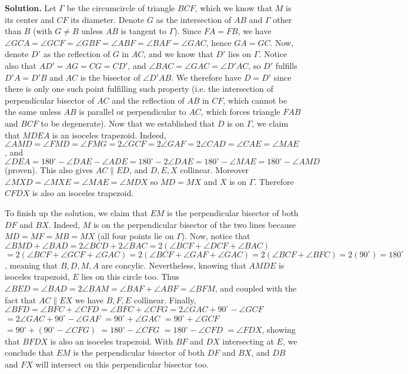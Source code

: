 \documentclass[11pt,a4paper]{article}
\begin{document}
\begin{itemize}
\textbf{Solution.} 
Let $\Gamma$ be the circumcircle of triangle $BCF$, which we know that $M$ is its center and $CF$ its diameter. 
Denote $G$ as the intersection of $AB$ and $\Gamma$ other than $B$ (with $G\neq B$ unless $AB$ is tangent to $\Gamma$). 
Since $FA=FB$, we have 
$\angle GCA=\angle GCF=\angle GBF=\angle ABF=\angle BAF=\angle GAC$, hence $GA=GC$. 
Now, denote $D'$ as the reflection of $G$ in $AC$, and we know that $D'$ lies on $\Gamma$. 
Notice also that $AD'=AG=CG=CD'$, and $\angle BAC=\angle GAC=\angle D'AC$, so $D'$ fulfills $D'A=D'B$ and $AC$ is the bisector of $\angle D'AB$. 
We therefore have $D=D'$ since there is only one such point fulfilling such property (i.e. the intersection of perpendicular bisector of $AC$ and the reflection of $AB$ in $CF$, which cannot be the same unless $AB$ is parallel or perpendicular to $AC$, which forces triangle $FAB$ and $BCF$ to be degenerate). 
Now that we established that $D$ is on $\Gamma$, we claim that $MDEA$ is an isoceles trapezoid. 
Indeed, $\angle AMD=\angle FMD=\angle FMG=2\angle GCF=2\angle GAF=2\angle CAD=\angle CAE=\angle MAE$, 
and $\angle DEA=180^{\circ}-\angle DAE-\angle ADE=180^{\circ}-2\angle DAE=180^{\circ}-\angle MAE=180^{\circ}-\angle AMD$ 
(proven). This also gives $AC\parallel ED$, and $D, E, X$ collinear. Moreover $\angle MXD=\angle MXE=\angle MAE=\angle MDX$ so $MD=MX$ and $X$ is on $\Gamma$. Therefore $CFDX$ is also an isoceles trapezoid. 

To finish up the solution, we claim that $EM$ is the perpendicular bisector of both $DF$ and $BX$. 
Indeed, $M$ is on the perpendicular bisector of the two lines because $MD=MF=MB=MX$ (all four points lie on $\Gamma$). 
Now, notice that $\angle BMD+\angle BAD=2\angle BCD+2\angle BAC=2(\angle BCF+\angle DCF+\angle BAC)$
$=2(\angle BCF+\angle GCF+\angle GAC)=2(\angle BCF+\angle GAF+\angle GAC)=2(\angle BCF+ \angle BFC)=2(90^{\circ})=180^{\circ}$, 
meaning that $B, D,  M, A$ are concylic. 
Nevertheless, knowing that $AMDE$ is isoceles trapezoid, $E$ lies on this circle too. 
Thus $\angle BED=\angle BAD=2\angle BAM=\angle BAF+\angle ABF=\angle BFM$, and coupled with the fact that $AC\parallel EX$ we have $B, F, E$ collinear. Finally, $\angle BFD=\angle BFC+\angle CFD=\angle BFC+\angle CFG=2\angle GAC+90^{\circ}-\angle GCF$
$=2\angle GAC+90^{\circ}-\angle GAF$
$=90^{\circ}+\angle GAC$
$=90^{\circ}+\angle GCF$
$=90^{\circ}+(90^{\circ}-\angle CFG)$
$=180^{\circ}-\angle CFG$
$=180^{\circ}-\angle CFD$
$=\angle FDX$, 
showing that $BFDX$ is also an isoceles trapezoid. With $BF$ and $DX$ intersecting at $E$, we conclude that $EM$ is the perpendicular bisector of both $DF$ and $BX$, and $DB$ and $FX$ will intersect on this perpendicular bisector too. 


\end{itemize}
\end{document}

